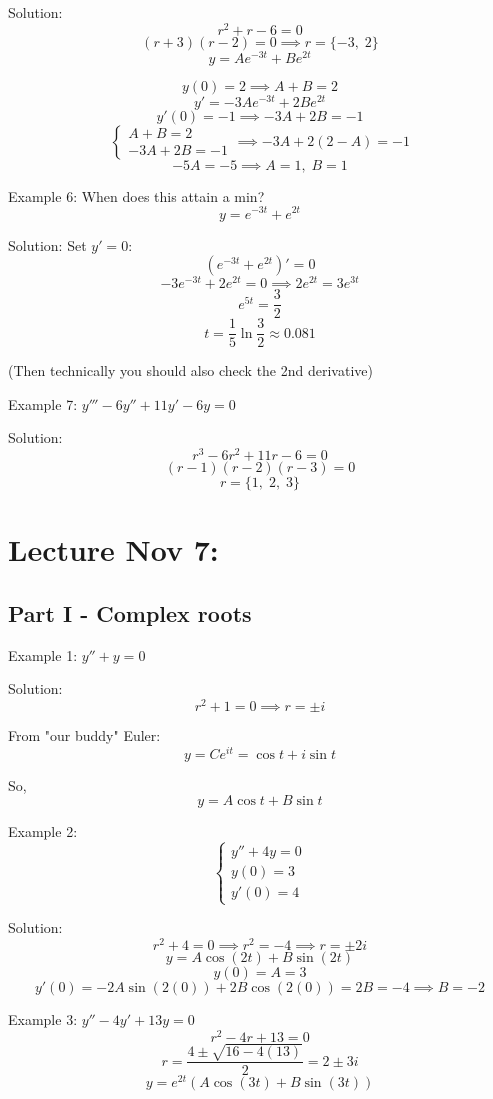 \documentclass[12pt]{article}
\begin{document}
Solution:
\[r^2 + r - 6 = 0\]
\[(r + 3)(r - 2) = 0 \implies r = \{-3, \; 2\}\]
\[y = Ae^{-3t} + Be^{2t}\]

\[y(0) = 2 \implies A + B = 2\]
\[y' = -3Ae^{-3t} + 2Be^{2t}\]
\[y'(0) = -1 \implies -3A + 2B = -1\]
\[\begin{cases}
    A + B = 2\\
    -3A + 2B = -1
\end{cases} \implies -3A + 2(2 - A) = -1\]
\[-5A = -5 \implies A = 1, \; B = 1\]


Example 6: When does this attain a min?
\[y = e^{-3t} + e^{2t}\]

Solution:
Set $y' = 0$:
\[(e^{-3t} + e^{2t})' = 0\]
\[-3e^{-3t} + 2e^{2t} = 0 \implies 2e^{2t} = 3e^{3t}\]
\[e^{5t} = \frac{3}{2}\]
\[t = \frac{1}{5} \ln \frac{3}{2} \approx 0.081\]

(Then technically you should also check the 2nd derivative)

Example 7: $y''' - 6y'' + 11y' - 6y = 0$

Solution:
\[r^3 - 6r^2 + 11r - 6 = 0\] 
\[(r - 1)(r - 2)(r - 3) = 0\]
\[r = \{1,\; 2,\; 3\}\]

\section{Lecture Nov 7:}
\subsection*{Part I - Complex roots}
Example 1: $y'' + y = 0$

Solution:
\[r^2 + 1 = 0 \implies r = \pm i \]

From "our buddy" Euler:
\[y = Ce^{it} = \cos t + i \sin t\]

So, 
\[y = A\cos t + B \sin t\]

Example 2: 
\[\begin{cases}
    y'' + 4y = 0\\
    y(0) = 3\\
    y'(0) = 4
\end{cases}\]

Solution:
\[r^2 + 4 = 0 \implies r^2 = -4 \implies r = \pm 2i\]
\[y = A\cos(2t) + B\sin (2t)\]
\[y(0) = A  = 3\]
\[y'(0) = -2A \sin(2(0)) + 2B\cos (2(0)) = 2B = -4 \implies B = -2\]

Example 3: $y'' - 4y' + 13y = 0$
\[r^2 - 4r + 13 = 0\]
\[r = \frac{4 \pm \sqrt{16 - 4(13)}}{2} = 2\pm 3i\]
\[y = e^{2t} (A\cos(3t) + B\sin(3t))\] 
\end{document}
